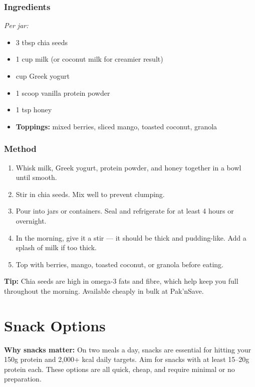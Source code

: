 \documentclass[12pt, a4paper]{book}
\newcommand{\ingredientheader}{\subsection*{\textcolor{accent}{Ingredients}}}
\newcommand{\methodheader}{\subsection*{\textcolor{accent}{Method}}}
\begin{document}
\ingredientheader

\textit{Per jar:}
\begin{itemize}[leftmargin=1.5em]
  \item 3 tbsp chia seeds
  \item 1 cup milk (or coconut milk for creamier result)
  \item \textonehalf{} cup Greek yogurt
  \item 1 scoop vanilla protein powder
  \item 1 tsp honey
  \item \textbf{Toppings:} mixed berries, sliced mango, toasted coconut, granola
\end{itemize}

\methodheader
\begin{enumerate}[leftmargin=1.5em]
  \item Whisk milk, Greek yogurt, protein powder, and honey together in a bowl until smooth.
  \item Stir in chia seeds. Mix well to prevent clumping.
  \item Pour into jars or containers. Seal and refrigerate for at least 4 hours or overnight.
  \item In the morning, give it a stir --- it should be thick and pudding-like. Add a splash of milk if too thick.
  \item Top with berries, mango, toasted coconut, or granola before eating.
\end{enumerate}

\begin{tipbox}
  \textbf{Tip:} Chia seeds are high in omega-3 fats and fibre, which help keep you full throughout the morning. Available cheaply in bulk at Pak'nSave.
\end{tipbox}

\chapter{Snack Options}

\begin{tipbox}
  \textbf{Why snacks matter:} On two meals a day, snacks are essential for hitting your 150g protein and 2,000+ kcal daily targets. Aim for snacks with at least 15--20g protein each. These options are all quick, cheap, and require minimal or no preparation.
\end{tipbox}
\end{document}
